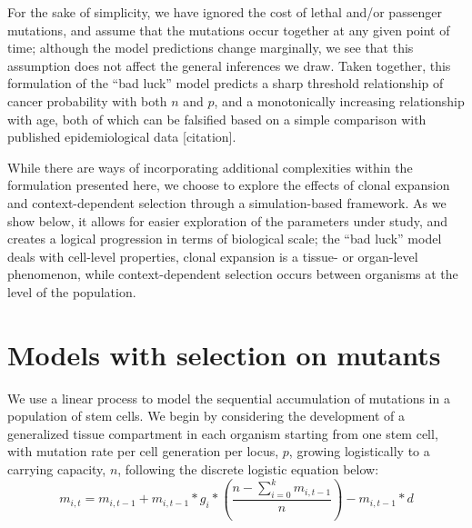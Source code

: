 \documentclass[9pt,twocolumn,twoside]{pnas-new}
\begin{document}
For the sake of simplicity, we have ignored the cost of lethal and/or passenger mutations, and assume that the mutations occur together at any given point of time; although the model predictions change marginally, we see that this assumption does not affect the general inferences we draw. Taken together, this formulation of the ``bad luck'' model predicts a sharp threshold relationship of cancer probability with both $n$ and $p$, and a monotonically increasing relationship with age, both of which can be falsified based on a simple comparison with published epidemiological data [citation].

While there are ways of incorporating additional complexities within the formulation presented here, we choose to explore the effects of clonal expansion and context-dependent selection through a simulation-based framework. As we show below, it allows for easier exploration of the parameters under study, and creates a logical progression in terms of biological scale; the ``bad luck'' model deals with cell-level properties, clonal expansion is a tissue- or organ-level phenomenon, while context-dependent selection occurs between organisms at the level of the population.

\section*{Models with selection on mutants}
We use a linear process to model the sequential accumulation of mutations in a population of stem cells. We begin by considering the development of a generalized tissue compartment in each organism starting from one stem cell, with mutation rate per cell generation per locus, $p$, growing logistically to a carrying capacity, $n$, following the discrete logistic equation below:
\begin{equation}
	m_{i, t} = m_{i, t-1} + m_{i, t-1}*g_{i}*(\dfrac{n-\sum_{i=0}^{k} m_{i, t-1}}{n}) - m_{i, t-1}*d
	\label{E3}	
\end{equation}
\end{document}
